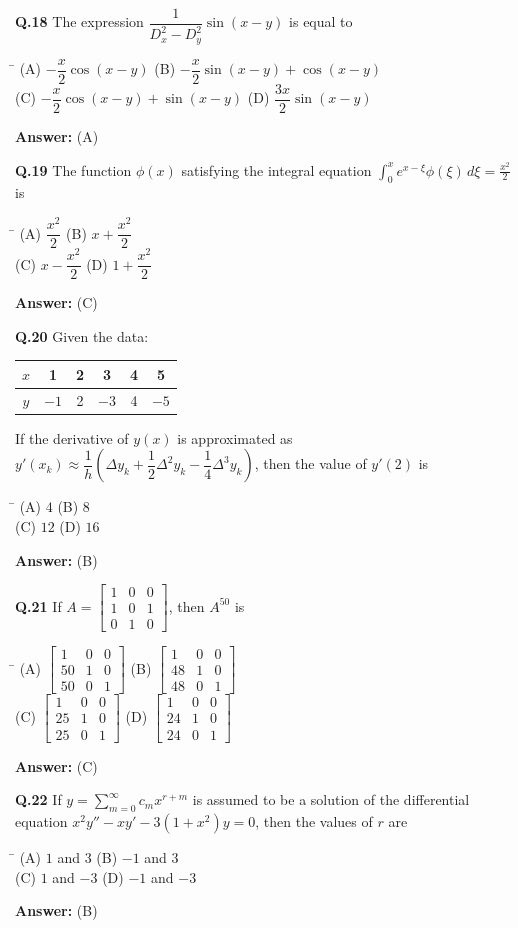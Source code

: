 \documentclass[11pt,a4paper]{article}
\newcommand{\optsfourA}[4]{%
  \begin{tabbing}
    \hspace{0.48\linewidth}\=\kill
    (A) #1 \> (B) #2 \\[2pt]
    (C) #3 \> (D) #4
  \end{tabbing}%
}
\newcommand{\ans}[1]{\textbf{Answer:} #1\par\medskip}
\begin{document}
\textbf{Q.18} The expression $\dfrac{1}{D_x^2 - D_y^2}\sin(x - y)$ is equal to
\optsfourA{$-\dfrac{x}{2}\cos(x - y)$}{$-\dfrac{x}{2}\sin(x - y) + \cos(x - y)$}{$-\dfrac{x}{2}\cos(x - y) + \sin(x - y)$}{$\dfrac{3x}{2}\sin(x - y)$}
\ans{(A)}

\textbf{Q.19} The function $\phi(x)$ satisfying the integral equation $\displaystyle\int_0^x e^{x - \xi}\phi(\xi)\,d\xi = \frac{x^2}{2}$ is
\optsfourA{$\dfrac{x^2}{2}$}{$x + \dfrac{x^2}{2}$}{$x - \dfrac{x^2}{2}$}{$1 + \dfrac{x^2}{2}$}
\ans{(C)}

\textbf{Q.20} Given the data:
\begin{center}
\begin{tabular}{cccccc}
  \toprule
  $x$ & 1 & 2 & 3 & 4 & 5 \\
  \midrule
  $y$ & $-1$ & 2 & $-3$ & 4 & $-5$ \\
  \bottomrule
\end{tabular}
\end{center}
If the derivative of $y(x)$ is approximated as $y'(x_k) \approx \dfrac{1}{h}\!\left(\Delta y_k + \dfrac{1}{2}\Delta^2 y_k - \dfrac{1}{4}\Delta^3 y_k\right)$, then the value of $y'(2)$ is
\optsfourA{$4$}{$8$}{$12$}{$16$}
\ans{(B)}

\textbf{Q.21} If $A = \begin{bmatrix} 1 & 0 & 0 \\ 1 & 0 & 1 \\ 0 & 1 & 0 \end{bmatrix}$, then $A^{50}$ is
\optsfourA{$\begin{bmatrix} 1 & 0 & 0 \\ 50 & 1 & 0 \\ 50 & 0 & 1 \end{bmatrix}$}{$\begin{bmatrix} 1 & 0 & 0 \\ 48 & 1 & 0 \\ 48 & 0 & 1 \end{bmatrix}$}{$\begin{bmatrix} 1 & 0 & 0 \\ 25 & 1 & 0 \\ 25 & 0 & 1 \end{bmatrix}$}{$\begin{bmatrix} 1 & 0 & 0 \\ 24 & 1 & 0 \\ 24 & 0 & 1 \end{bmatrix}$}
\ans{(C)}

\textbf{Q.22} If $y = \displaystyle\sum_{m=0}^{\infty} c_m x^{r + m}$ is assumed to be a solution of the differential equation $x^2 y'' - xy' - 3(1 + x^2)y = 0$, then the values of $r$ are
\optsfourA{$1$ and $3$}{$-1$ and $3$}{$1$ and $-3$}{$-1$ and $-3$}
\ans{(B)}
\end{document}
